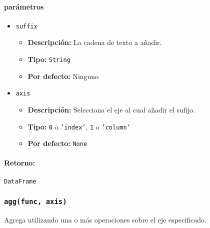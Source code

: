         \paragraph{\textbf{parámetros}}
        \begin{itemize}
            \item \texttt{suffix}
                \begin{itemize}
                    \item \textbf{Descripción:} La cadena de texto a añadir.
                    \item \textbf{Tipo:} \texttt{String}
                    \item \textbf{Por defecto:} Ninguno
                \end{itemize}
            \item \texttt{axis}
                \begin{itemize}
                    \item \textbf{Descripción:} Selecciona el eje al cual añadir el sufijo.
                    \item \textbf{Tipo:} \texttt{0} o \texttt{'index'}, \texttt{1} o \texttt{'column'}
                    \item \textbf{Por defecto:} \texttt{None}
                \end{itemize}
        \end{itemize}
        \paragraph{Retorno:} \texttt{DataFrame}


        \subsubsection{\texttt{agg(func, axis)}} Agrega utilizando una o más operaciones sobre el eje especificado.
